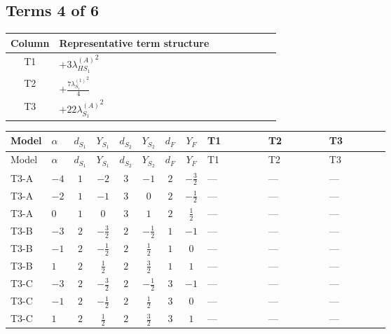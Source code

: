 \documentclass[8pt]{article}
\begin{document}
\begin{landscape}
\subsection*{Terms 4 of 6}
\begin{center}
\begin{tabular}{@{}c >{\raggedright\arraybackslash}p{0.82\linewidth}@{}}
\toprule
Column & Representative term structure \\
\midrule
T1 & \(\displaystyle +3 {\lambda_{HS_1}^{(A)}}^2\) \\
\midrule
T2 & \(\displaystyle +\frac{7 {\lambda_{S_1}^{(1)}}^2}{4}\) \\
\midrule
T3 & \(\displaystyle +22 {\lambda_{S_1}^{(A)}}^2\) \\
\midrule
\bottomrule
\end{tabular}
\end{center}
\smallskip
\tiny
\begin{longtable}{@{}llcccccc >{\raggedright\arraybackslash}p{0.21\linewidth} >{\raggedright\arraybackslash}p{0.21\linewidth} >{\raggedright\arraybackslash}p{0.21\linewidth}@{}}
\toprule
Model & $\alpha$ & $d_{S_1}$ & $Y_{S_1}$ & $d_{S_2}$ & $Y_{S_2}$ & $d_F$ & $Y_F$ & T1 & T2 & T3 \\
\midrule
\endfirsthead
\toprule
Model & $\alpha$ & $d_{S_1}$ & $Y_{S_1}$ & $d_{S_2}$ & $Y_{S_2}$ & $d_F$ & $Y_F$ & T1 & T2 & T3 \\
\midrule
\endhead
T3-A & $-4$ & $1$ & $-2$ & $3$ & $-1$ & $2$ & $-\frac{3}{2}$ & --- & --- & --- \\
\midrule
T3-A & $-2$ & $1$ & $-1$ & $3$ & $0$ & $2$ & $-\frac{1}{2}$ & --- & --- & --- \\
\midrule
T3-A & $0$ & $1$ & $0$ & $3$ & $1$ & $2$ & $\frac{1}{2}$ & --- & --- & --- \\
\midrule
T3-B & $-3$ & $2$ & $-\frac{3}{2}$ & $2$ & $-\frac{1}{2}$ & $1$ & $-1$ & --- & --- & --- \\
\midrule
T3-B & $-1$ & $2$ & $-\frac{1}{2}$ & $2$ & $\frac{1}{2}$ & $1$ & $0$ & --- & --- & --- \\
\midrule
T3-B & $1$ & $2$ & $\frac{1}{2}$ & $2$ & $\frac{3}{2}$ & $1$ & $1$ & --- & --- & --- \\
\midrule
T3-C & $-3$ & $2$ & $-\frac{3}{2}$ & $2$ & $-\frac{1}{2}$ & $3$ & $-1$ & --- & --- & --- \\
\midrule
T3-C & $-1$ & $2$ & $-\frac{1}{2}$ & $2$ & $\frac{1}{2}$ & $3$ & $0$ & --- & --- & --- \\
\midrule
T3-C & $1$ & $2$ & $\frac{1}{2}$ & $2$ & $\frac{3}{2}$ & $3$ & $1$ & --- & --- & --- \\

\end{longtable}
\end{landscape}
\end{document}

